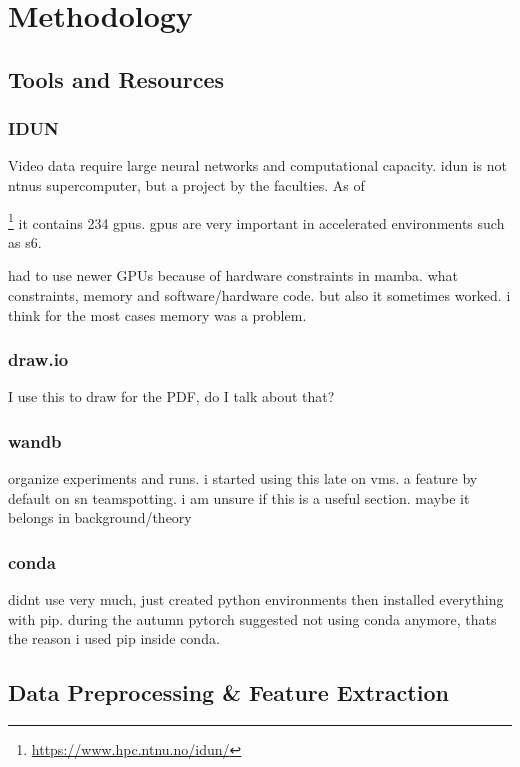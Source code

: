 \chapter{Methodology} 
\label{chap:methodology}

\section{Tools and Resources}

\subsection{IDUN}
Video data require large neural networks and computational capacity. \acrfull{idun} is not \acrshort{ntnu}s supercomputer, but a project by the faculties. As of \date{2024-04-24}\footnote{\url{https://www.hpc.ntnu.no/idun/}} it contains 234 \acrfull{gpu}s. \acrshort{gpu}s are very important in accelerated environments such as \acrshort{s6}. 

had to use newer GPUs because of hardware constraints in mamba. what constraints, memory and software/hardware code. but also it sometimes worked. i think for the most cases memory was a problem. 

\subsection{draw.io}
I use this to draw for the PDF, do I talk about that?

\subsection{wandb}
organize experiments and runs. i started using this late on vms. a feature by default on sn teamspotting. i am unsure if this is a useful section. maybe it belongs in background/theory

\subsection{conda}

didnt use very much, just created python environments then installed everything with pip. during the autumn pytorch suggested not using conda anymore, thats the reason i used pip inside conda. 

\section{Data Preprocessing \& Feature Extraction}
\label{sec:preprocessing}


